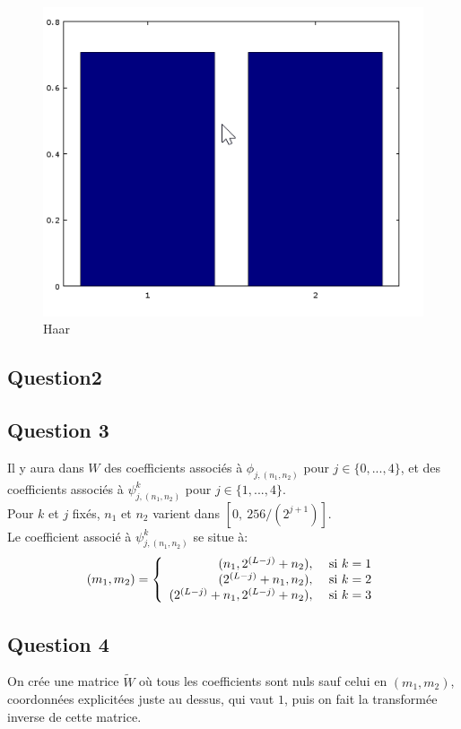 \documentclass{report}
\begin{document}
\begin{figure}[H]
\begin{center}
\includegraphics{Haar.png}
\end{center}
\caption{Haar}
\end{figure}

\subsection*{Question2}

\subsection*{Question 3}
Il y aura dans $W$ des coefficients associés à $\phi_{j, (n_1, n_2)}$ pour $j \in \{0, ..., 4\}$, et des coefficients associés à $\psi^k_{j, (n_1, n_2)}$ pour $j\in \{1, ..., 4\}$.\\
Pour $k$ et $j$ fixés, $n_1$ et $n_2$ varient dans $[0,\ 256/(2^{j+1})]$.\\
Le coefficient associé à $\psi^k_{j,(n_1,n_2)}$ se situe à: 
\begin{eqnarray*}
(m_1, m_2) = 
\left\{
\begin{array}{r c l}
 (n_1, 2^{(L-j)}+n_2), &\mbox{ si } k=1\\
 (2^{(L-j)}+n_1, n_2), &\mbox{ si } k=2\\
 (2^{(L-j)}+n_1, 2^{(L-j)}+n_2), &\mbox{ si } k=3 
 \end{array}
 \right.
 \end{eqnarray*}
\subsection*{Question 4}
On crée une matrice $\tilde{W}$ où tous les coefficients sont nuls sauf celui en $(m_1, m_2)$, coordonnées explicitées juste au dessus, qui vaut $1$, puis on fait la transformée inverse de cette matrice.
\end{document}
